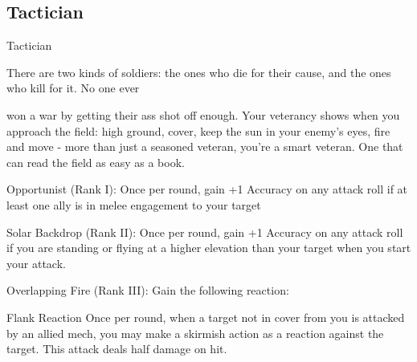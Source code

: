 \subsection{Tactician}

                                                   Tactician  

There are two kinds of soldiers: the ones who die for their cause, and the ones who kill for it. No one ever  

won a war by getting their ass shot off enough. Your veterancy shows when you approach the field: high  
ground, cover, keep the sun in your enemy’s eyes, fire and move - more than just a seasoned veteran,  
you’re a smart veteran. One that can read the field as easy as a book. 
 

Opportunist (Rank I): Once per round, gain +1 Accuracy on any attack roll if at least one ally is  
in melee engagement to your target
 
Solar Backdrop (Rank II): Once per round, gain +1 Accuracy on any attack roll if you are  
standing or flying at a higher elevation than your target when you start your attack.
 
Overlapping Fire (Rank III): Gain the following reaction:
 

                                                                                                                 


	        Flank  
         Reaction  
         Once per round, when a target not in cover from you is attacked by an allied mech, you  
         may make a skirmish action as a reaction against the target. This attack deals half  
         damage on hit.